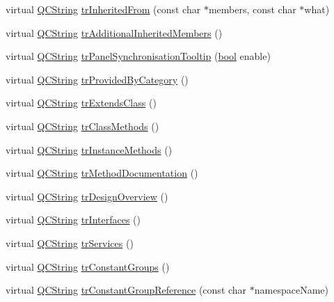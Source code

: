 \begin{DoxyCompactItemize}
\item 
virtual \hyperlink{class_q_c_string}{Q\+C\+String} \hyperlink{class_translator_korean_a39ef233d8406f38840c602e193655a9a}{tr\+Inherited\+From} (const char $\ast$members, const char $\ast$what)
\item 
virtual \hyperlink{class_q_c_string}{Q\+C\+String} \hyperlink{class_translator_korean_a096ae3361ae83defe9af3576640f046e}{tr\+Additional\+Inherited\+Members} ()
\item 
virtual \hyperlink{class_q_c_string}{Q\+C\+String} \hyperlink{class_translator_korean_a446b002d4dd72752c0999337b1393ef1}{tr\+Panel\+Synchronisation\+Tooltip} (\hyperlink{qglobal_8h_a1062901a7428fdd9c7f180f5e01ea056}{bool} enable)
\item 
virtual \hyperlink{class_q_c_string}{Q\+C\+String} \hyperlink{class_translator_korean_af196b1d7279afbc65b8dda44ce762dc5}{tr\+Provided\+By\+Category} ()
\item 
virtual \hyperlink{class_q_c_string}{Q\+C\+String} \hyperlink{class_translator_korean_a75a4e4c569fcfd2d93760151477489f2}{tr\+Extends\+Class} ()
\item 
virtual \hyperlink{class_q_c_string}{Q\+C\+String} \hyperlink{class_translator_korean_a7f125d37850a9fe95e285dbce3ace5b3}{tr\+Class\+Methods} ()
\item 
virtual \hyperlink{class_q_c_string}{Q\+C\+String} \hyperlink{class_translator_korean_a65a32b76e6abc671c7d7aba9594613b1}{tr\+Instance\+Methods} ()
\item 
virtual \hyperlink{class_q_c_string}{Q\+C\+String} \hyperlink{class_translator_korean_a755dec4d84768a66ec18c401c23f5e97}{tr\+Method\+Documentation} ()
\item 
virtual \hyperlink{class_q_c_string}{Q\+C\+String} \hyperlink{class_translator_korean_a8bb98b800296c28e2693e6c472ed4012}{tr\+Design\+Overview} ()
\item 
virtual \hyperlink{class_q_c_string}{Q\+C\+String} \hyperlink{class_translator_korean_a04a9331e7df2bcbcda7292d653955653}{tr\+Interfaces} ()
\item 
virtual \hyperlink{class_q_c_string}{Q\+C\+String} \hyperlink{class_translator_korean_a650db331250ec35f164e9a8c7763ca22}{tr\+Services} ()
\item 
virtual \hyperlink{class_q_c_string}{Q\+C\+String} \hyperlink{class_translator_korean_a08d1ba766aaae7466eb378aeb6b0c25b}{tr\+Constant\+Groups} ()
\item 
virtual \hyperlink{class_q_c_string}{Q\+C\+String} \hyperlink{class_translator_korean_ac4d4f3c2f52af47529424f97a923e670}{tr\+Constant\+Group\+Reference} (const char $\ast$namespace\+Name)

\end{DoxyCompactItemize}
